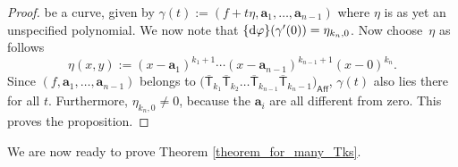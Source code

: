 \documentclass[pdftex]{sigma}
\numberwithin{equation}{section}
\begin{document}
\begin{proof}
be a curve, given by
$\gamma(t) := (f+t\eta, \mathbf{a}_1, \dots, \mathbf{a}_{n-1})$
where $\eta$ is as yet an unspecified polynomial. We now note that
$\{{\rm d} \varphi\}(\gamma^{\prime}(0)) = \eta_{k_{n}, 0}$. Now choose~$\eta$ as follows
\[ \eta(x, y) := (x-\mathbf{a}_1)^{k_1+1} \cdots (x-\mathbf{a}_{n-1})^{k_{n-1}+1} (x-0)^{k_n}.\]
Since $(f, \mathbf{a}_1, \dots, \mathbf{a}_{n-1})$
belongs to $\bigl(\overline{\mathsf{T}}_{k_1} \overline{\mathsf{T}}_{k_2}
\dots \overline{\mathsf{T}}_{k_{n-1}} \overline{\mathsf{T}}_{k_{n}-1}\bigr)_{\mathsf{Aff}}$,
$\gamma(t)$
also lies there for all $t$.
Furthermore, $\eta_{k_n, 0} \neq 0$, because the $\mathbf{a}_i$ are all different from zero.
This proves the proposition.
\end{proof}

We are now ready to prove Theorem \ref{theorem_for_many_Tks}.
\end{document}
